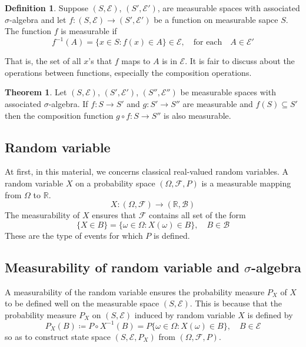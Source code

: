 \documentclass[twoside]{article}
\theoremstyle{definition}
\newtheorem{definition}{Definition}[section]
\newtheorem{theorem}{Theorem}[section]
\theoremstyle{remark}
\theoremstyle{remark}
\begin{document}
\begin{definition}
  Suppose $(S, \mathcal{E})$, $(S', \mathcal{E}')$, are measurable spaces with
  associated $\sigma$-algebra and let $f:(S, \mathcal{E}) \rightarrow (S', \mathcal{E}')$
  be a function on measurable sapce $S$. The function $f$ is measurable if
  \begin{equation}
    f^{-1}(A) = {\{ x \in S : f(x) \in A \}} \in \mathcal{E},
    \quad \textrm{for each} \quad A \in \mathcal{E}'
  \end{equation}
\end{definition}

That is, the set of all $x$'s that $f$ maps to $A$ is in $\mathcal{E}$. It
is fair to discuss about the operations between functions, especially the
composition operations.

\begin{theorem}
  Let $(S, \mathcal{E})$, $(S', \mathcal{E}')$, $(S'', \mathcal{E}'')$ be
  measurable spaces with associated $\sigma$-algebra. If $f:S \rightarrow S'$
  and $g:S' \rightarrow S''$ are measurable and $f(S) \subseteq S'$ then the
  composition function $g \circ f: S \rightarrow S''$ is also measurable.
\end{theorem}

\subsection{Random variable}
At first, in this material, we concerns classical real-valued random variables.
A random variable $X$ on a probability space $(\Omega, \mathcal{F}, P)$ is a
measurable mapping from $\Omega$ to $\mathbb{R}$.
\begin{equation}
  X: (\Omega, \mathcal{F}) \rightarrow (\mathbb{R}, \mathcal{B})
\end{equation}
The measurability of $X$ ensures that $\mathcal{F}$ contains all set of
the form
\begin{equation}
  {\{X \in B\}} = {\{ \omega \in \Omega : X(\omega) \in B \}}, \quad B \in \mathcal{B}
\end{equation}
These are the type of events for which $P$ is defined.

\subsection{Measurability of random variable and $\sigma$-algebra}
A measurability of the random variable ensures the probability measure $P_X$
of $X$ to be defined well on the measurable space $(S, \mathcal{E})$.
This is because that the probability measure $P_X$ on $(S, \mathcal{E})$
induced by random variable $X$ is defined by
\begin{equation}
  P_X(B) \coloneqq P \circ X^{-1}(B) = P{\{ \omega \in \Omega : X(\omega) \in B \}},
  \quad B \in \mathcal{E}
\end{equation}
so as to construct state space $(S, \mathcal{E}, P_X)$ from $(\Omega, \mathcal{F}, P)$.
\end{document}
